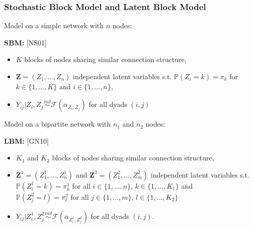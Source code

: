 \documentclass[nopagenumber,9pt]{beamer}
\renewcommand{\P}{\mathbb{P}}
\newcommand{\bZ}{\mathbf{Z}}
\newcommand{\citemano}[1]{\textcolor{dgreen}{#1}}
\begin{document}
\begin{frame}
 \frametitle{Stochastic Block Model and Latent Block Model}

 Model on a simple network with $n$ nodes:
 
 \textbf{SBM:} \citemano{[NS01]}\\
 \begin{itemize}
 \item $K$ blocks of nodes sharing similar connection structure,
  \item $\bZ=(Z_1,\ldots,Z_n)$  independent latent variables s.t. $\P (Z_i=k)\overset{}{=} \pi_k$ for $k\in\{1,\ldots,K\}$ and $i\in\{1,\ldots,n\}$,
  \item $Y_{ij}|Z_i,Z_j\overset{ind}{\sim} \mathcal{F}(\alpha_{Z_i,Z_j})$ for all dyads $(i,j)$
 \end{itemize}

  

  \bigskip

  Model on a bipartite network with $n_1$ and $n_2$ nodes:

 \textbf{LBM:} \citemano{[GN10]}\\
 \begin{itemize}
 \item $K_1$ and $K_2$ blocks of nodes sharing similar connection structure,
 \item $\bZ^1=(Z^1_1,\ldots,Z^1_n)$ and $\bZ^2=(Z^2_1,\ldots,Z^2_m)$
 independent latent variables s.t.
 $\P(Z^1_i=k)=\pi^1_k$ for all $i\in\{1,\ldots,n\}$, $k\in\{1,\ldots,K_1\}$ and\\ $\P(Z^2_j=l)=\pi^2_l $ for all $j\in\{1,\ldots,m\}$, $l\in\{1,\ldots,K_2\}$
 \item $ Y_{ij}|Z^1_i,Z^2_j\overset{ind}{\sim} \mathcal{F}(\alpha_{Z^1_i,Z^2_j})$ for all dyads $(i,j)$.

 
 \end{itemize}
 
 

\end{frame}
\end{document}
